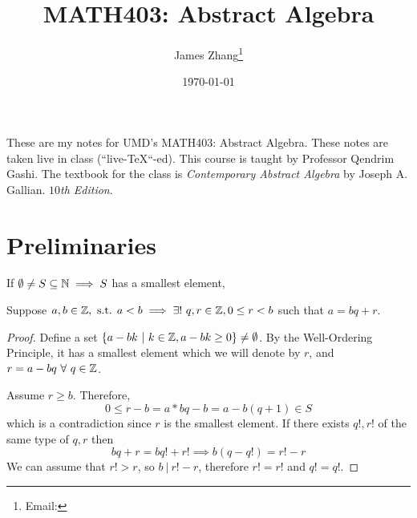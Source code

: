 \documentclass[12pt]{scrartcl}
\begin{document}
\title{MATH403: Abstract Algebra}
\author{James Zhang\thanks{Email: }}
\date{\today}




\maketitle
These are my notes for UMD's MATH403: Abstract Algebra. These notes are taken live in class 
(``live-\TeX``-ed). This course is taught by Professor Qendrim Gashi. The textbook for the class is 
\textit{Contemporary Abstract Algebra} by Joseph A. Gallian. \textit{$10$th Edition}.
\tableofcontents

\newpage

\section{Preliminaries}

\begin{definition}
  If $\emptyset \neq S \subseteq \mathbb N \implies S$ has a smallest element, 
\end{definition}

\begin{theorem}
  Suppose $a, b \in \mathbb Z, \text{ s.t. } a < b \implies \exists! \  q, r \in \mathbb Z, 0 \leq r < b$ 
  such that $a = bq + r$.

  \begin{proof}

    \hfill

    Define a set $\{a - bk \ | \ k \in \mathbb Z, a - bk \geq 0\} \neq \emptyset$. By the Well-Ordering Principle, 
    it has a smallest element which we will denote by $r$, and $r = a - bq \ \forall \ q \in \mathbb Z$.

    Assume $r \geq b$. Therefore, 
    \[0 \leq r - b = a * bq - b = a - b(q+1) \in S\]
    which is a contradiction since $r$ is the smallest element. If there exists $q!, r!$ of the same 
    type of $q, r$ then 
    \[bq + r = bq! + r! \implies b(q - q!) = r! - r\]
    We can assume that $r! > r$, so $b \ | \ r! - r$, therefore $r! = r!$ and $q! = q!$.
  \end{proof}
\end{theorem}
\end{document}
